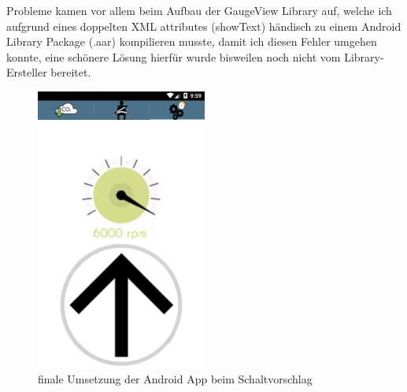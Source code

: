 Probleme kamen vor allem beim Aufbau der GaugeView Library auf, welche ich aufgrund eines doppelten XML attributes (showText) händisch zu einem Android Library Package (.aar) kompilieren musste, damit ich diesen Fehler umgehen konnte, eine schönere Lösung hierfür wurde bisweilen noch nicht vom Library-Ersteller bereitet. 



\begin{figure}[!htb]\centering
		\includegraphics[width=0.5\textwidth]{images/schalt}
		\caption{finale Umsetzung der Android App beim Schaltvorschlag} \label{fig:imgShiftAndroidFinished}
\end{figure}


\clearpage %